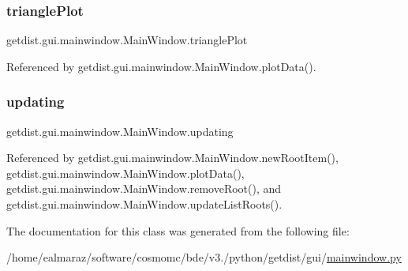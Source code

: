 \subsubsection{\texorpdfstring{triangle\+Plot}{trianglePlot}}
{\footnotesize\ttfamily getdist.\+gui.\+mainwindow.\+Main\+Window.\+triangle\+Plot}



Referenced by getdist.\+gui.\+mainwindow.\+Main\+Window.\+plot\+Data().

\mbox{\label{classgetdist_1_1gui_1_1mainwindow_1_1MainWindow_aae95c1cdc2de48443e12249c96d75f23}} 
\subsubsection{\texorpdfstring{updating}{updating}}
{\footnotesize\ttfamily getdist.\+gui.\+mainwindow.\+Main\+Window.\+updating}



Referenced by getdist.\+gui.\+mainwindow.\+Main\+Window.\+new\+Root\+Item(), getdist.\+gui.\+mainwindow.\+Main\+Window.\+plot\+Data(), getdist.\+gui.\+mainwindow.\+Main\+Window.\+remove\+Root(), and getdist.\+gui.\+mainwindow.\+Main\+Window.\+update\+List\+Roots().



The documentation for this class was generated from the following file\+:\begin{DoxyCompactItemize}
\item 
/home/ealmaraz/software/cosmomc/bde/v3./python/getdist/gui/\mbox{\hyperlink{mainwindow_8py}{mainwindow.\+py}}\end{DoxyCompactItemize}
